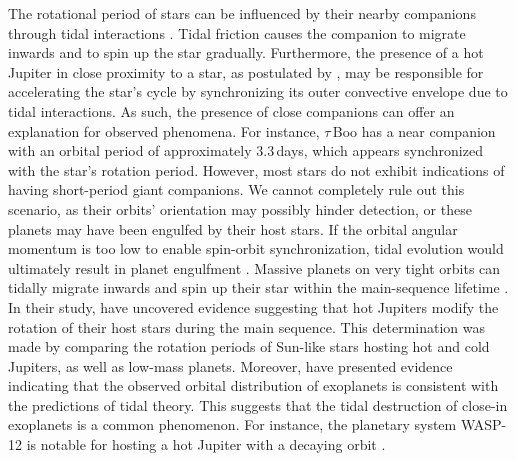 \documentclass[traditabstract,longauth]{aa}
\begin{document}
The rotational period of stars can be influenced by their nearby companions through tidal interactions \citep[e.g.,][]{Fleming19,Santos19}. Tidal friction causes the companion to migrate inwards and to spin up the star gradually. Furthermore, the presence of a hot Jupiter in close proximity to a star, as postulated by \citet{Fares09}, may be responsible for accelerating the star's cycle by synchronizing its outer convective envelope due to tidal interactions. As such, the presence of close companions can offer an explanation for observed phenomena. For instance, $\tau$\,Boo has a near companion with an orbital period of approximately 3.3\,days, which appears synchronized with the star's rotation period. However, most stars do not exhibit indications of having short-period giant companions. We cannot completely rule out this scenario, as their orbits' orientation may possibly hinder detection, or these planets may have been engulfed by their host stars. If the orbital angular momentum is too low to enable spin-orbit synchronization, tidal evolution would ultimately result in planet engulfment \citep{Hut80}. Massive planets on very tight orbits can tidally migrate inwards and spin up their star within the main-sequence lifetime \citep{Carone07,Jackson09,Tejada21}. In their study, \cite{Tejada21} have uncovered evidence suggesting that hot Jupiters modify the rotation of their host stars during the main sequence. This determination was made by comparing the rotation periods of Sun-like stars hosting hot and cold Jupiters, as well as low-mass planets. Moreover, \cite{Jackson09} have presented evidence indicating that the observed orbital distribution of exoplanets is consistent with the predictions of tidal theory. This suggests that the tidal destruction of close-in exoplanets is a common phenomenon. For instance, the planetary system WASP-12 is notable for hosting a hot Jupiter with a decaying orbit \citep{Yee20}.
\end{document}

